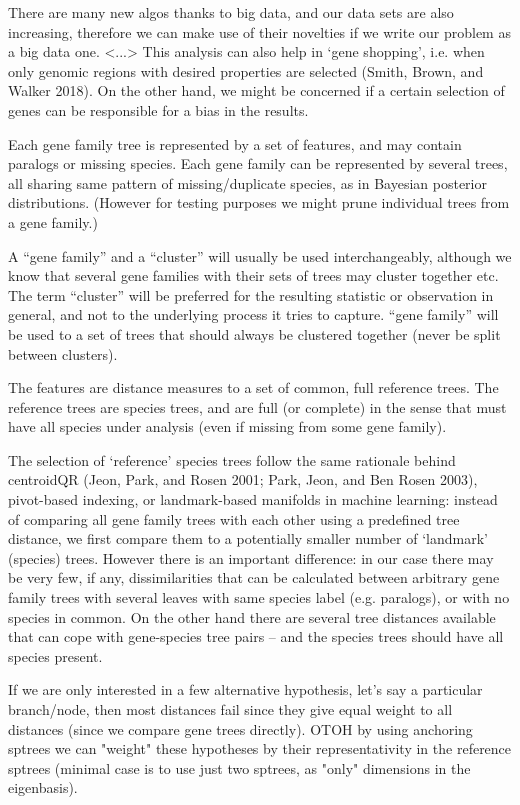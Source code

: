 There are many new algos thanks to big data, and our data sets are also increasing, therefore we can make use of their
novelties if we write our problem as a big data one. <...> This analysis can also help in ‘gene shopping’, i.e. when
only genomic regions with desired properties are selected (Smith, Brown, and Walker 2018). On the other hand, we might
be concerned if a certain selection of genes can be responsible for a bias in the results.

Each gene family tree is represented by a set of features, and may contain paralogs or missing species. Each gene family
can be represented by several trees, all sharing same pattern of missing/duplicate species, as in Bayesian posterior
distributions. (However for testing purposes we might prune individual trees from a gene family.)

A “gene family” and a “cluster” will usually be used interchangeably, although we know that several gene families with
their sets of trees may cluster together etc. The term “cluster” will be preferred for the resulting statistic or
observation in general, and not to the underlying process it tries to capture. “gene family” will be used to a set of
trees that should always be clustered together (never be split between clusters).

The features are distance measures to a set of common, full reference trees. The reference trees are species trees, and
are full (or complete) in the sense that must have all species under analysis (even if missing from some gene family).

The selection of ‘reference’ species trees follow the same rationale behind centroidQR (Jeon, Park, and Rosen 2001;
Park, Jeon, and Ben Rosen 2003), pivot-based indexing, or landmark-based manifolds in machine learning: instead of
comparing all gene family trees with each other using a predefined tree distance, we first compare them to a potentially
smaller number of ‘landmark’ (species) trees. However there is an important difference: in our case there may be very
few, if any, dissimilarities that can be calculated between arbitrary gene family trees with several leaves with same
species label (e.g. paralogs), or with no species in common. On the other hand there are several tree distances
available that can cope with gene-species tree pairs – and the species trees should have all species present.

If we are only interested in a few alternative hypothesis, let’s say a particular branch/node, then most distances fail
since they give equal weight to all distances (since we compare gene trees directly). OTOH by using anchoring sptrees we
can "weight" these hypotheses by their representativity in the reference sptrees (minimal case is to use just two
sptrees, as "only" dimensions in the eigenbasis).

